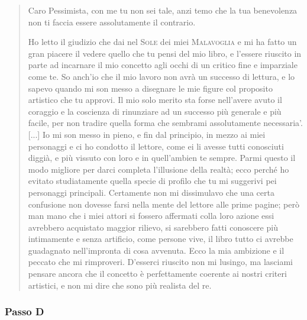 \documentclass{book}
\begin{document}
\begin{quote}
Caro Pessimista, con me tu non sei tale, anzi temo che la tua benevolenza non ti faccia essere assolutamente il contrario.

Ho letto il giudizio che dai nel \textsc{Sole} dei miei \textsc{Malavoglia} e mi ha fatto un gran piacere il vedere quello che tu pensi del mio libro, e l'essere riuscito in parte ad incarnare il mio concetto agli occhi di un critico fine e imparziale come te. So anch'io che il mio lavoro non avrà un successo di lettura, e lo sapevo quando mi son messo a disegnare le mie figure col proposito artistico che tu approvi. Il mio solo merito sta forse nell'avere avuto il coraggio e la coscienza di rinunziare ad un successo più generale e più facile, per non tradire quella forma che sembrami assolutamente necessaria'. [...] Io mi son messo in pieno, e fin dal principio, in mezzo ai miei personaggi e ci ho condotto il lettore, come ei li avesse tutti conosciuti diggià, e più vissuto con loro e in quell'ambien te sempre. Parmi questo il modo migliore per darci completa l'illusione della realtà; ecco perché ho evitato studiatamente quella specie di profilo che tu mi suggerivi pei personaggi principali. Certamente non mi dissimulavo che una certa confusione non dovesse farsi nella mente del lettore alle prime pagine; però man mano che i miei attori si fossero affermati colla loro azione essi avrebbero acquistato maggior rilievo, si sarebbero fatti conoscere più intimamente e senza artificio, come persone vive, il libro tutto ci avrebbe guadagnato nell'impronta di cosa avvenuta. Ecco la mia ambizione e il peccato che mi rimproveri. D'esserci riuscito non mi lusingo, ma lasciami pensare ancora che il concetto è perfettamente coerente ai nostri criteri artistici, e non mi dire che sono più realista del re.
\end{quote}

\subsubsection{Passo D}
\end{document}
